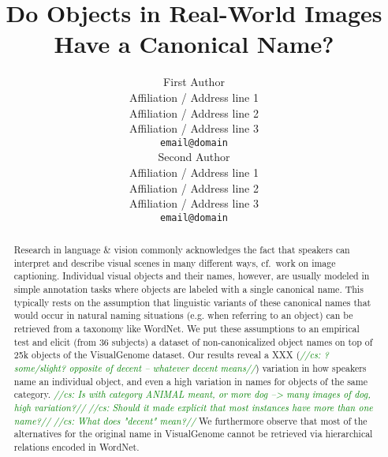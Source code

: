 \documentclass[11pt,a4paper]{article}
\title{Do Objects in Real-World Images Have a Canonical Name?}
\author{First Author \\
  Affiliation / Address line 1 \\
  Affiliation / Address line 2 \\
  Affiliation / Address line 3 \\
  {\tt email@domain} \\\And
  Second Author \\
  Affiliation / Address line 1 \\
  Affiliation / Address line 2 \\
  Affiliation / Address line 3 \\
  {\tt email@domain} \\}
\date{}
\newcommand{\cs}[1]{\textcolor{green}{\emph{//cs: #1//}}}
\begin{document}
\maketitle

\begin{abstract}
Research in language \& vision commonly acknowledges the fact that speakers can interpret and describe visual scenes in many different ways, cf.\ work on image captioning. 
Individual visual objects and their names, however, are usually modeled in simple annotation tasks where objects are labeled with a single canonical name. 
This typically rests on the assumption that linguistic variants of these canonical names that would occur in natural naming situations (e.g. when referring to an object) can be retrieved %
from a taxonomy like WordNet.
We put these assumptions 
to an empirical test and elicit (from 36 subjects) a dataset of non-canonicalized object names on top of 25k objects of the VisualGenome dataset. 
Our results reveal a XXX (\cs{?some/slight? opposite of decent -- whatever decent means}) variation in how speakers name an individual object, and even a high variation in names for objects of the same category.
\cs{Is with category ANIMAL meant, or more dog --> many images of dog, high variation?}
\cs{Should it made explicit that most instances have more than one name?}
\cs{What does "decent" mean?}
We furthermore observe that most of the alternatives for the original name in VisualGenome cannot be retrieved via hierarchical relations encoded in WordNet. %

\end{abstract}
\end{document}
